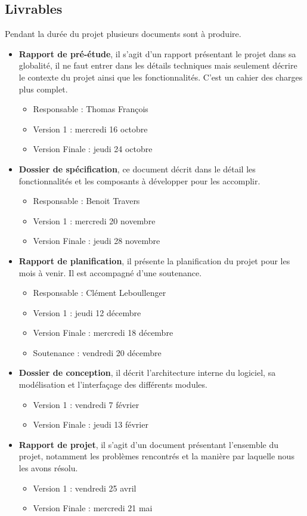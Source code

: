 \documentclass[a4paper]{article}
\begin{document}
\subsection{Livrables}
\label{subsec:livrables}

	Pendant la dur\'ee du projet plusieurs documents sont \`a produire.
\begin{itemize}
\item \textbf{Rapport de pr\'e-\'etude}, il s'agit d'un rapport pr\'esentant le projet dans sa globalit\'e, il ne faut entrer dans les d\'etails techniques mais seulement d\'ecrire le contexte du projet ainsi que les fonctionnalit\'es. C'est un cahier des charges plus complet.
\begin{itemize}
\item Responsable : Thomas Fran\c{c}ois
\item Version 1 : mercredi 16 octobre
\item Version Finale : jeudi 24 octobre
\end{itemize}
\item \textbf{Dossier de sp\'ecification}, ce document d\'ecrit dans le d\'etail les fonctionnalit\'es et les composants \`a d\'evelopper pour les accomplir.
\begin{itemize}
\item Responsable : Benoit Travers
\item Version 1 : mercredi 20 novembre
\item Version Finale : jeudi 28 novembre
\end{itemize}
\item \textbf{Rapport de planification}, il pr\'esente la planification du projet pour les mois \`a venir. Il est accompagn\'e d'une soutenance.
\begin{itemize}
\item Responsable : Cl\'ement Leboullenger
\item Version 1 : jeudi 12 d\'ecembre
\item Version Finale : mercredi 18 d\'ecembre
\item Soutenance : vendredi 20 d\'ecembre
\end{itemize}
\item \textbf{Dossier de conception}, il d\'ecrit l'architecture interne du logiciel, sa mod\'elisation et l'interfa\c{c}age des diff\'erents modules.
\begin{itemize}
\item Version 1 : vendredi 7 f\'evrier
\item Version Finale : jeudi 13 f\'evrier
\end{itemize}
\item \textbf{Rapport de projet}, il s'agit d'un document pr\'esentant l'ensemble du projet, notamment les probl\`emes rencontr\'es et la mani\`ere par laquelle nous les avons r\'esolu.
\begin{itemize}
\item Version 1 : vendredi 25 avril
\item Version Finale : mercredi 21 mai
\end{itemize}
\end{itemize}
\end{document}
